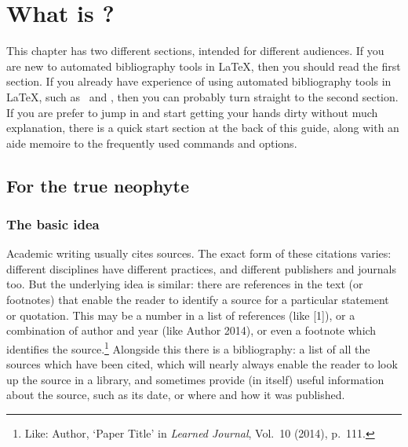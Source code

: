 
\chapter{What is ?}\label{ch:introduction}

This chapter has two different sections, intended for different
audiences. If you are new to automated bibliography tools in \LaTeX,
then you should read the first section. If
you already have experience of using automated bibliography tools in
\LaTeX, such as \bibtex\ and , then you can probably
turn straight to the second section. If you
are prefer to jump in and start getting your hands dirty without much
explanation, there is a quick start section at the back of this
guide, along with an aide memoire to
the frequently used commands and
options.

\section{For the true neophyte}

\subsection{The basic idea}
\label{newbie}

Academic writing usually cites sources. 
The exact form of these
citations varies: different disciplines have different practices, and
different publishers and journals too. But the underlying idea is
similar: there are references in the text (or footnotes) that enable
the reader to identify a source for a particular statement or
quotation. This may be a number in a list of references (like [1]),
or a combination of author and year (like Author 2014), or even a
footnote which identifies the source.\footnote{Like: Author, `Paper
  Title' in \emph{Learned Journal}, Vol.\ 10 (2014), p.\ 111.}
Alongside this there is a bibliography: a list of all the sources
which have been cited, which will nearly always enable the reader to
look up the source in a library, and sometimes provide (in itself)
useful information about the source, such as its date, or where
and how it was published.

